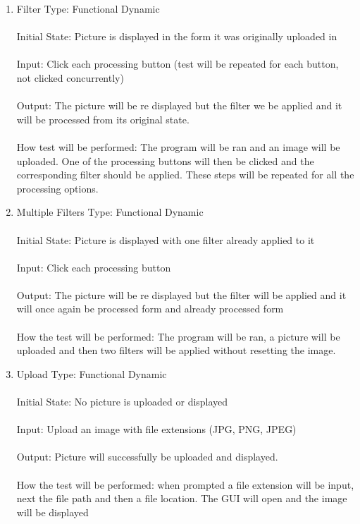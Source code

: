 \documentclass[12pt, titlepage]{article}
\begin{document}
\begin{enumerate}

\item{Filter}
Type: Functional Dynamic\\ \\
Initial State: Picture is displayed in the form it was originally uploaded in\\ \\
Input: Click each processing button (test will be repeated for each button, not clicked concurrently)\\ \\
Output: The picture will be re displayed but the filter we be applied and it will be processed from its original state. \\ \\
How test will be performed: The program will be ran and an image will be uploaded. One of the processing buttons will then be clicked and the corresponding filter should be applied. These steps will be repeated for all the processing options.

\item{Multiple Filters}
Type: Functional Dynamic\\ \\
Initial State: Picture is displayed with one filter already applied to it\\ \\
Input: Click each processing button\\ \\
Output: The picture will be re displayed but the filter will be applied and it will once again be processed form and already processed form \\ \\
How the test will be performed: The program will be ran, a picture will be uploaded and then two filters will be applied without resetting the image.

\item{Upload}
Type: Functional Dynamic \\ \\
Initial State: No picture is uploaded or displayed \\ \\
Input: Upload an image with file extensions (JPG, PNG, JPEG) \\ \\
Output: Picture will successfully be uploaded and displayed. \\ \\
How the test will be performed: when prompted a file extension will be input, next the file path and then a file location. The GUI will open and the image will be displayed


\end{enumerate}
\end{document}
